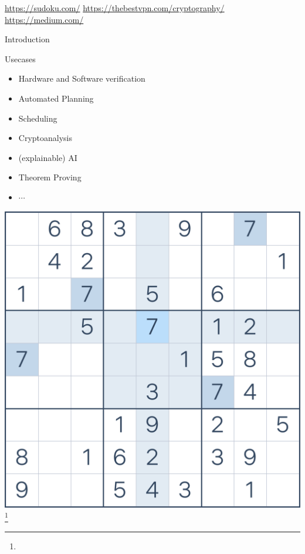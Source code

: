 \documentclass[]{sdqbeamer}
\begin{document}
\urldef{\sudokuurl}\url{https://sudoku.com/}
\urldef{\cryptourl}\url{https://thebestvpn.com/cryptography/}
\urldef{\aiurl}\url{https://medium.com/}
\begin{frame}{Introduction}
    \begin{minipage}{.45\textwidth}
        \begin{block}{Usecases}
            \begin{itemize}
                \item Hardware and Software verification
                \item Automated Planning
                \item Scheduling
                \item Cryptoanalysis
                \item (explainable) AI
                \item Theorem Proving
                \item $\cdots$
            \end{itemize}
            \end{block}
    \end{minipage}
    \hfill
    \begin{minipage}{.45\textwidth}
        \includegraphics[scale=.075]{images/Sudoku.png}\footnote{\sudokuurl}

\end{minipage}
\end{frame}
\end{document}
